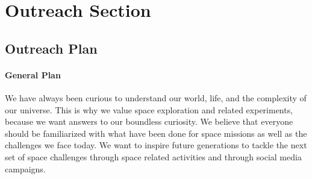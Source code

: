 \documentclass{article}
\begin{document}
\section{Outreach Section}
\subsection{Outreach Plan}
\paragraph{General Plan}
We have always been curious to understand our world, life, and the complexity of our universe. This is why we value space exploration and related experiments, because we want answers to our boundless curiosity. We believe that everyone should be familiarized with what have been done for space missions as well as the challenges we face today. We want to inspire future generations to tackle the next set of space challenges through space related activities and through social media campaigns. 
\end{document}

